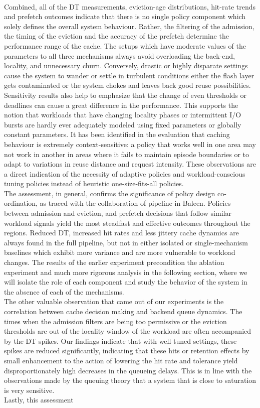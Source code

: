 \documentclass[sigconf]{acmart}
\begin{document}
{\\\indent Combined, all of the DT measurements, eviction-age distributions, hit-rate trends and prefetch outcomes indicate that there is no single policy component which solely defines the overall system behaviour. Rather, the filtering of the admission, the timing of the eviction and the accuracy of the prefetch determine the performance range of the cache. The setups which have moderate values of the parameters to all three mechanisms always avoid overloading the back-end, locality, and unnecessary churn. Conversely, drastic or highly disparate settings cause the system to wander or settle in turbulent conditions either the flash layer gets contaminated or the system chokes and leaves back good reuse possibilities.\\\indent Sensitivity results also help to emphasize that the change of even thresholds or deadlines can cause a great difference in the performance. This supports the notion that workloads that have changing locality phases or intermittent I/O bursts are hardly ever adequately modeled using fixed parameters or globally constant parameters. It has been identified in the evaluation that caching behaviour is extremely context-sensitive: a policy that works well in one area may not work in another in areas where it fails to maintain episode boundaries or to adapt to variations in reuse distance and request intensity. These observations are a direct indication of the necessity of adaptive policies and workload-conscious tuning policies instead of heuristic one-size-fits-all policies.\\\indent The assessment, in general, confirms the significance of policy design co-ordination, as traced with the collaboration of pipeline in Baleen. Policies between admission and eviction, and prefetch decisions that follow similar workload signals yield the most steadfast and effective outcomes throughout the regions. Reduced DT, increased hit rates and less jittery cache dynamics are always found in the full pipeline, but not in either isolated or single-mechanism baselines which exhibit more variance and are more vulnerable to workload changes. The results of the earlier experiment precondition the ablation experiment and much more rigorous analysis in the following section, where we will isolate the role of each component and study the behavior of the system in the absence of each of the mechanisms.\\\indent The other valuable observation that came out of our experiments is the correlation between cache decision making and backend queue dynamics. The times when the admission filters are being too permissive or the eviction thresholds are out of the locality window of the workload are often accompanied by the DT spikes. Our findings indicate that with well-tuned settings, these spikes are reduced significantly, indicating that these hits or retention effects by small enhancement to the action of lowering the hit rate and tolerance yield disproportionately high decreases in the queueing delays. This is in line with the observations made by the queuing theory that a system that is close to saturation is very sensitive.\\\indent Lastly, this assessment }
\end{document}
